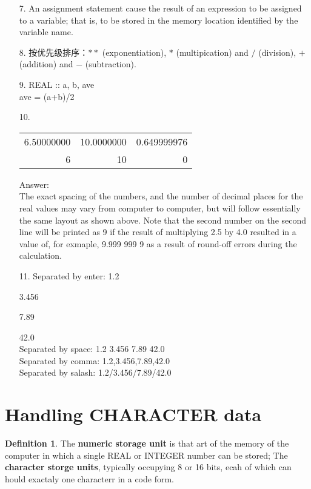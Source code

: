 \documentclass[a4paper,titlepage]{report}
\theoremstyle{definition}
\newtheorem{defn}{Definition}
\begin{document}
\begin{itemize}
  \item[7.]
  An assignment statement cause the result of an expression to be assigned to a variable; that is, to be stored in the memory location identified by the variable name.

  \item[8.]
  按优先级排序：$**$ (exponentiation), $*$ (multipication) and $/$ (division), $+$ (addition) and $-$ (subtraction).

  \item[9.]
  REAL :: a, b, ave \\
  ave = (a+b)/2

  \item[10.]
  \begin{tabular}{rrr}
  6.50000000&       10.0000000&      0.649999976\\
          6&          10&           0\\
  \end{tabular}

  Answer: \\
  The exact spacing of the numbers, and the number of decimal places for the real values may vary from computer to computer, but will follow essentially the same layout as shown above. Note that the second number on the second line will be printed as 9 if the result of multiplying 2.5 by 4.0 resulted in a value of, for exmaple, 9.999 999 9 as a result of round-off errors during the calculation.

  \item[11.]
  \setlength{\parindent}{21ex}  
  Separated by enter: 1.2 \par 3.456\par 7.89 \par 42.0 \\
  Separated by space: 1.2 3.456 7.89 42.0 \\
  Separated by comma: 1.2,3.456,7.89,42.0 \\
  Separated by salash: 1.2/3.456/7.89/42.0 \\

\end{itemize}

\section{Handling CHARACTER data}

\begin{defn}
The \textbf{numeric storage unit} is that art of the memory of the computer in which a single REAL or INTEGER number can be stored; 
The \textbf{character storge units}, typically occupying 8 or 16 bits, ecah of which can hould exactaly one characterr in a code form.
\end{defn}
\end{document}

